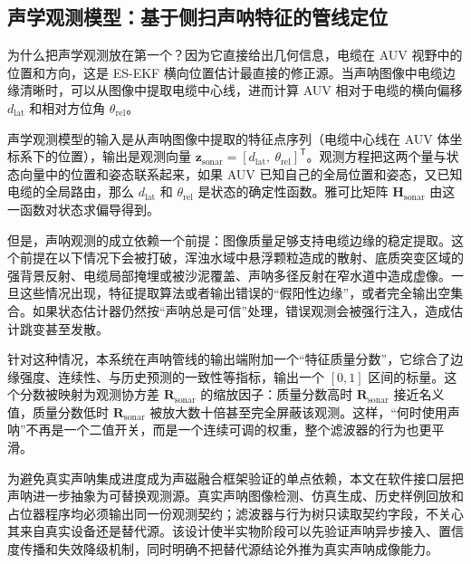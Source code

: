 \subsection{声学观测模型：基于侧扫声呐特征的管线定位}\label{sec:ch03-3-3-2}

为什么把声学观测放在第一个？因为它直接给出几何信息，电缆在 AUV 视野中的位置和方向，这是 ES-EKF 横向位置估计最直接的修正源。当声呐图像中电缆边缘清晰时，可以从图像中提取电缆中心线，进而计算 AUV 相对于电缆的横向偏移 \(d_{\mathrm{lat}}\) 和相对方位角 \(\theta_{\mathrm{rel}}\)。

声学观测模型的输入是从声呐图像中提取的特征点序列（电缆中心线在 AUV 体坐标系下的位置），输出是观测向量 \(\boldsymbol{z}_{\mathrm{sonar}}=[d_{\mathrm{lat}},\ \theta_{\mathrm{rel}}]^{\mathsf{T}}\)。观测方程把这两个量与状态向量中的位置和姿态联系起来，如果 AUV 已知自己的全局位置和姿态，又已知电缆的全局路由，那么 \(d_{\mathrm{lat}}\) 和 \(\theta_{\mathrm{rel}}\) 是状态的确定性函数。雅可比矩阵 \(\boldsymbol{H}_{\mathrm{sonar}}\) 由这一函数对状态求偏导得到。

但是，声呐观测的成立依赖一个前提：图像质量足够支持电缆边缘的稳定提取。这个前提在以下情况下会被打破，浑浊水域中悬浮颗粒造成的散射、底质突变区域的强背景反射、电缆局部掩埋或被沙泥覆盖、声呐多径反射在窄水道中造成虚像。一旦这些情况出现，特征提取算法或者输出错误的``假阳性边缘''，或者完全输出空集合。如果状态估计器仍然按``声呐总是可信''处理，错误观测会被强行注入，造成估计跳变甚至发散。

针对这种情况，本系统在声呐管线的输出端附加一个``特征质量分数''，它综合了边缘强度、连续性、与历史预测的一致性等指标，输出一个 \([0,1]\) 区间的标量。这个分数被映射为观测协方差 \(\boldsymbol{R}_{\mathrm{sonar}}\) 的缩放因子：质量分数高时 \(\boldsymbol{R}_{\mathrm{sonar}}\) 接近名义值，质量分数低时 \(\boldsymbol{R}_{\mathrm{sonar}}\) 被放大数十倍甚至完全屏蔽该观测。这样，``何时使用声呐''不再是一个二值开关，而是一个连续可调的权重，整个滤波器的行为也更平滑。

为避免真实声呐集成进度成为声磁融合框架验证的单点依赖，本文在软件接口层把声呐进一步抽象为可替换观测源。真实声呐图像检测、仿真生成、历史样例回放和占位器程序均必须输出同一份观测契约；滤波器与行为树只读取契约字段，不关心其来自真实设备还是替代源。该设计使半实物阶段可以先验证声呐异步接入、置信度传播和失效降级机制，同时明确不把替代源结论外推为真实声呐成像能力。

